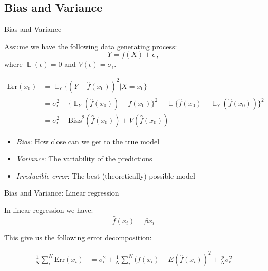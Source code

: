 \documentclass[10pt,handout]{beamer}
\DeclareMathOperator{\E}{\mathbb{E}}
\begin{document}
\subsection{Bias and Variance}


\begin{frame}{Bias and Variance}

Assume we have the following data generating process:
\[
Y = f(X) + \epsilon\,,
\]
where $\E(\epsilon)=0$ and $V(\epsilon)=\sigma_\epsilon$.

\begin{align*}
\text{Err}(x_0) &= \E_{Y}\{(Y-\hat{f}(x_0))^2 | X = x_0\} \\
  &= \sigma^2_\epsilon + \{\E_Y(\hat{f}(x_0)) - f(x_0)\}^2 + \E\{\hat{f}(x_0) - \E_Y(\hat{f}(x_0))\}^2 \\
  &= \sigma^2_\epsilon + \text{Bias}^2(\hat{f}(x_0)) + V(\hat{f}(x_0))
\end{align*}

\begin{itemize}
\item \emph{Bias}: How close can we get to the true model
\item \emph{Variance}: The variability of the predictions
\item \emph{Irreducible error}: The best (theoretically) possible model
\end{itemize}

\end{frame}


\begin{frame}{Bias and Variance: Linear regression}

In linear regression we have:
\[
\hat{f}(x_i) = \hat{\beta} x_i
\]

This give us the following error decomposition:

\begin{align*}
\frac{1}{N}\sum^N_i \text{Err}(x_i) &= \sigma^2_\epsilon + \frac{1}{N}\sum^N_i (f(x_i) - E(\hat{f}(x_i))^2 + \frac{p}{N} \sigma^2_\epsilon
\end{align*}

\end{frame}
\end{document}
